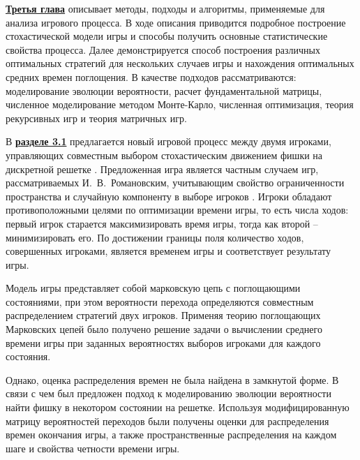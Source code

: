 

\underline{\textbf{Третья глава}} описывает методы, подходы и алгоритмы, применяемые для анализа игрового процесса. В ходе описания приводится подробное построение стохастической модели игры и способы получить основные статистические свойства процесса. Далее демонстрируется способ построения различных оптимальных стратегий для нескольких случаев игры и нахождения оптимальных средних времен поглощения. В качестве подходов рассматриваются: моделирование эволюции вероятности, расчет фундаментальной матрицы, численное моделирование методом Монте-Карло, численная оптимизация, теория рекурсивных игр и теория матричных игр. 

В \underline{\textbf{разделе 3.1}} предлагается новый игровой процесс между двумя игроками, управляющих совместным выбором стохастическим движением фишки на дискретной решетке \cite{bib3}. Предложенная игра является частным случаем игр, рассматриваемых И.~В.~Романовским, учитывающим свойство ограниченности пространства и случайную компоненту в выборе игроков \cite{romanovsky_1961}. Игроки обладают противоположными целями по оптимизации времени игры, то есть числа ходов: первый игрок старается максимизировать время игры, тогда как второй -- минимизировать его. По достижении границы поля количество ходов, совершенных игроками, является временем игры и соответствует результату игры.

Модель игры представляет собой марковскую цепь с поглощающими состояниями, при этом вероятности перехода определяются совместным распределением стратегий двух игроков. Применяя теорию поглощающих Марковских цепей было получено решение задачи о вычислении среднего времени игры при заданных вероятностях выборов игроками для каждого состояния. 

Однако, оценка распределения времен не была найдена в замкнутой форме. В связи с чем был предложен подход к моделированию эволюции вероятности найти фишку в некотором состоянии на решетке. Используя модифицированную матрицу вероятностей переходов были получены оценки для распределения времен окончания игры, а также пространственные распределения на каждом шаге и свойства четности времени игры.

